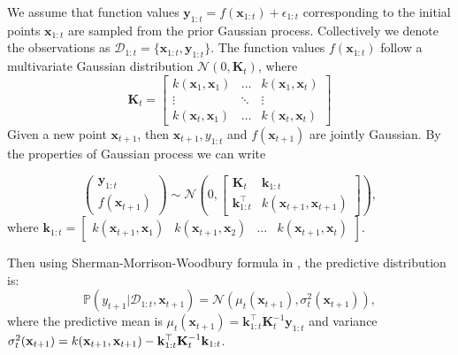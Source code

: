 
We assume that function values ${\mathbf{y}}_{1:t} = f(\mathbf{x}_{1:t})+\epsilon_{1:t}$ corresponding to the initial points $\mathbf{x}_{1:t}$ are sampled
from the prior Gaussian process. Collectively we denote the observations as $\mathcal{D}_{1:t} = \{\mathbf{x}_{1:t}, \mathbf{y}_{1:t}\}$. The function
values $f(\mathbf{x}_{1:t})$ follow a multivariate Gaussian distribution $\mathcal{N}(0, \mathbf{K}_t)$, where
\[ \mathbf{K}_t = \begin{bmatrix} 
    k(\mathbf{x}_1, \mathbf{x}_1) & \dots  & k(\mathbf{x}_1, \mathbf{x}_t)\\
    \vdots & \ddots & \vdots\\
    k(\mathbf{x}_t, \mathbf{x}_1) & \dots  & k(\mathbf{x}_t, \mathbf{x}_t)
    \end{bmatrix}
\]
Given a new point $\mathbf{x}_{t+1}$, then $\mathbf{x}_{t+1},  y_{1:t}$ and $f(\mathbf{x}_{t+1})$ are jointly Gaussian. By the properties of Gaussian process we
can write

\[
\begin{pmatrix}
\mathbf{y}_{1:t} \\
f(\mathbf{x}_{t+1})
\end{pmatrix} \sim \mathcal{N}\left(0, \begin{bmatrix}
\mathbf{K}_t & \mathbf{k}_{1:t} \\
\mathbf{k}_{1:t}^\top & k(\mathbf{x}_{t+1}, \mathbf{x}_{t+1})
\end{bmatrix} \right), 
\]
where $\mathbf{k}_{1:t} = \begin{bmatrix}
k(\mathbf{x}_{t+1}, \mathbf{x}_1) & k(\mathbf{x}_{t+1}, \mathbf{x}_2) & \dots & k(\mathbf{x}_{t+1}, \mathbf{x}_t)
\end{bmatrix}$.

Then using Sherman-Morrison-Woodbury formula in \citet{rasmussen2006gaussian}, the predictive distribution is:
\[ \mathbb{P}(y_{t+1} \lvert \mathcal{D}_{1:t}, \mathbf{x}_{t+1})= \mathcal{N}(\mu_t(\mathbf{x}_{t+1}), \sigma_t^2(\mathbf{x}_{t+1})), 
\]
where the predictive mean is $\mu_t(\mathbf{x}_{t+1}) = \mathbf{k}_{1:t}^\top \mathbf{K}_t^{-1} \mathbf{y}_{1:t}$ and variance $\sigma_{t}^{2}({\bf x}_{t+1}) = k({\bf x}_{t+1},{\bf x}_{t+1})-{\bf k}_{1:t}^{\top} \mathbf{K}_t^{-1}{\bf k}_{1:t}$. 

